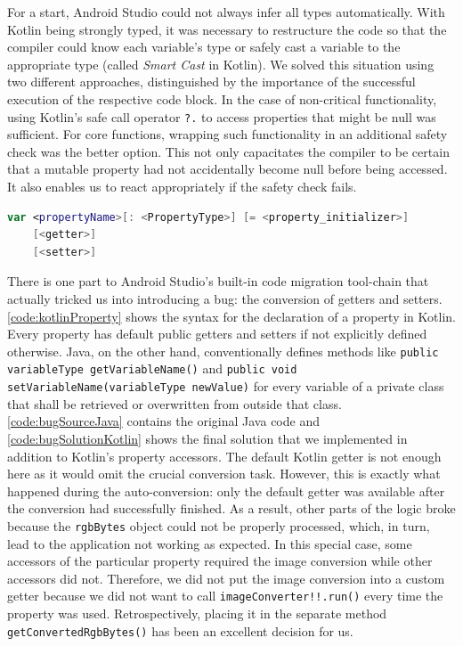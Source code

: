 \documentclass[
			   fontsize=11pt,
               paper=a4,
               bibliography=totoc,
               idxtotoc,
               headsepline,
               footsepline,
               footinclude=false,
               BCOR=12mm,
               DIV=13,
               openany,   %
               ]
               {scrbook}
\newcommand{\code}[1]{\lstinline[basicstyle = \ttfamily\small]{#1}} %
\begin{document}
For a start, Android Studio could not always infer all types automatically. With Kotlin being strongly typed, it was necessary to restructure the code so that the compiler could know each variable's type or safely cast a variable to the appropriate type (called \textit{Smart Cast} in Kotlin). We solved this situation using two different approaches, distinguished by the importance of the successful execution of the respective code block. In the case of non-critical functionality, using Kotlin's safe call operator \code{?.} to access properties that might be null was sufficient. For core functions, wrapping such functionality in an additional safety check was the better option. This not only capacitates the compiler to be certain that a mutable property had not accidentally become null before being accessed. It also enables us to react appropriately if the safety check fails. \\

\begin{lstlisting}[style=standard, language=Kotlin, label=code:kotlinProperty, caption={Kotlin's declaration syntax for a mutable property. Getter and setter are optional. The property type is only optional when the compiler can infer it from the context (meaning either from the initializer or from the return type of the getter).}]
var <propertyName>[: <PropertyType>] [= <property_initializer>]
	[<getter>]
	[<setter>]
\end{lstlisting}

There is one part to Android Studio's built-in code migration tool-chain that actually tricked us into introducing a bug: the conversion of getters and setters. \autoref{code:kotlinProperty} shows the syntax for the declaration of a property in Kotlin. Every property has default public getters and setters if not explicitly defined otherwise. Java, on the other hand, conventionally defines methods like \code{public variableType getVariableName()} and \code{public void setVariableName(variableType newValue)} for every variable of a private class that shall be retrieved or overwritten from outside that class. \\

\autoref{code:bugSourceJava} contains the original Java code and \autoref{code:bugSolutionKotlin} shows the final solution that we implemented in addition to Kotlin's property accessors. The default Kotlin getter is not enough here as it would omit the crucial conversion task. However, this is exactly what happened during the auto-conversion: only the default getter was available after the conversion had successfully finished. As a result, other parts of the logic broke because the \code{rgbBytes} object could not be properly processed, which, in turn, lead to the application not working as expected. In this special case, some accessors of the particular property required the image conversion while other accessors did not. Therefore, we did not put the image conversion into a custom getter because we did not want to call \code{imageConverter!!.run()} every time the property was used. Retrospectively, placing it in the separate method \code{getConvertedRgbBytes()} has been an excellent decision for us.
\end{document}
